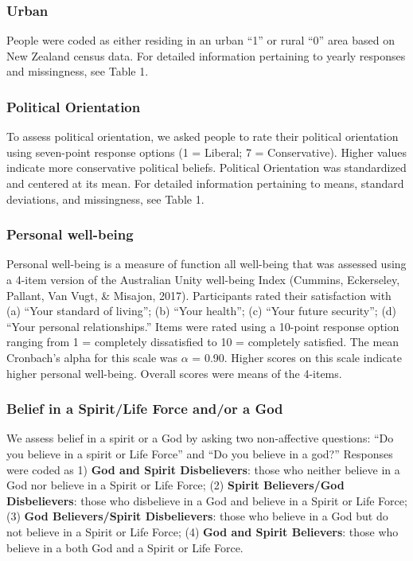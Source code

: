 \documentclass[
  english,
  man,floatsintext]{apa6}
\begin{document}
\hypertarget{urban}{%
\subsubsection{Urban}\label{urban}}

People were coded as either residing in an urban ``1'' or rural ``0'' area based on New Zealand census data. For detailed information pertaining to yearly responses and missingness, see Table 1.

\hypertarget{political-orientation}{%
\subsubsection{Political Orientation}\label{political-orientation}}

To assess political orientation, we asked people to rate their political orientation using seven-point response options (1 = Liberal; 7 = Conservative). Higher values indicate more conservative political beliefs. Political Orientation was standardized and centered at its mean. For detailed information pertaining to means, standard deviations, and missingness, see Table 1.

\hypertarget{personal-well-being}{%
\subsubsection{Personal well-being}\label{personal-well-being}}

Personal well-being is a measure of function all well-being that was assessed using a 4-item version of the Australian Unity well-being Index (Cummins, Eckerseley, Pallant, Van Vugt, \& Misajon, 2017). Participants rated their satisfaction with (a) ``Your standard of living''; (b) ``Your health''; (c) ``Your future security''; (d) ``Your personal relationships.'' Items were rated using a 10-point response option ranging from 1 = completely dissatisfied to 10 = completely satisfied. The mean Cronbach's alpha for this scale was \(\alpha\) = 0.90. Higher scores on this scale indicate higher personal well-being. Overall scores were means of the 4-items.

\hypertarget{belief-in-a-spiritlife-force-andor-a-god}{%
\subsubsection{Belief in a Spirit/Life Force and/or a God}\label{belief-in-a-spiritlife-force-andor-a-god}}

We assess belief in a spirit or a God by asking two non-affective questions: ``Do you believe in a spirit or Life Force'' and ``Do you believe in a god?'' Responses were coded as 1) \textbf{God and Spirit Disbelievers}: those who neither believe in a God nor believe in a Spirit or Life Force; (2) \textbf{Spirit Believers/God Disbelievers}: those who disbelieve in a God and believe in a Spirit or Life Force; (3) \textbf{God Believers/Spirit Disbelievers}: those who believe in a God but do not believe in a Spirit or Life Force; (4) \textbf{God and Spirit Believers}: those who believe in a both God and a Spirit or Life Force.
\end{document}
